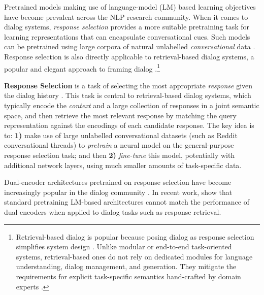 \documentclass[11pt,a4paper]{article}
\begin{document}
Pretrained models making use of language-model (LM) based learning objectives have become prevalent across the NLP research community. When it comes to dialog systems, \emph{response selection} provides a more suitable pretraining task for learning representations that can encapsulate conversational cues. Such models can be pretrained using large corpora of natural unlabelled \emph{conversational} data \cite{Henderson:2019acl,Mehri:2019acl}. Response selection is also directly applicable to retrieval-based dialog systems, a popular and elegant approach to framing dialog  \cite{Wu:2017acl,Weston:2018ws,Mazare:2018emnlp,Gunasekara:2019dstc7,Henderson:2019acl}.\footnote{Retrieval-based dialog is popular because posing dialog as response selection \cite{Gunasekara:2019dstc7} simplifies system design  \cite{Boussaha:2019arxiv}. Unlike modular or end-to-end task-oriented systems, retrieval-based ones do not rely on dedicated modules for language understanding, dialog management, and generation. They mitigate the requirements for explicit task-specific semantics hand-crafted by domain experts \cite{Henderson:14a,Mrksic:15,Mrksic:17}.
}







\vspace{1.4mm}
\noindent \textbf{Response Selection} is a task of selecting the most appropriate \textit{response} given the dialog history \cite{Wang:2013emnlp,AlRfou:2016arxiv,Yang:2018repl,Du:2018scai,Chaudhuri:2018conll}. This task is central to retrieval-based dialog systems, which typically encode the \textit{context} and a large collection of responses in a joint semantic space, and then retrieve the most relevant response by matching the query representation against the encodings of each candidate response. The key idea is to: \textbf{1)} make use of large unlabelled conversational datasets (such as Reddit conversational threads) to \textit{pretrain} a neural model on the general-purpose response selection task; and then \textbf{2)} \textit{fine-tune} this model, potentially with additional network layers, using much smaller amounts of task-specific data. 

Dual-encoder architectures pretrained on response selection have become increasingly popular in the dialog community \cite{Cer:2018arxiv,Humeau:2019arxiv,Henderson:2019acl}. In recent work,  show that standard pretraining LM-based architectures cannot match the performance of dual encoders when applied to dialog tasks such as response retrieval.
\end{document}
